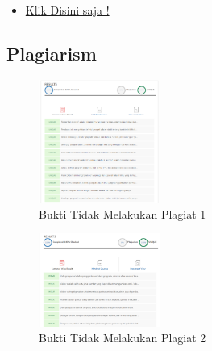\begin{itemize}
	\item \href{https://www.youtube.com/watch?v=Dw8NGQUF-YQ} {Klik Disini saja !}
\end{itemize}

\subsection{Plagiarism}
\begin{figure}[H]
	\includegraphics[width=4cm]{figures/1174021/buktiplagi1.png}
	\centering
	\caption{Bukti Tidak Melakukan Plagiat 1}
\end{figure}

\begin{figure}[H]
	\includegraphics[width=4cm]{figures/1174021/buktiplagi2.png}
	\centering
	\caption{Bukti Tidak Melakukan Plagiat 2}
\end{figure}



